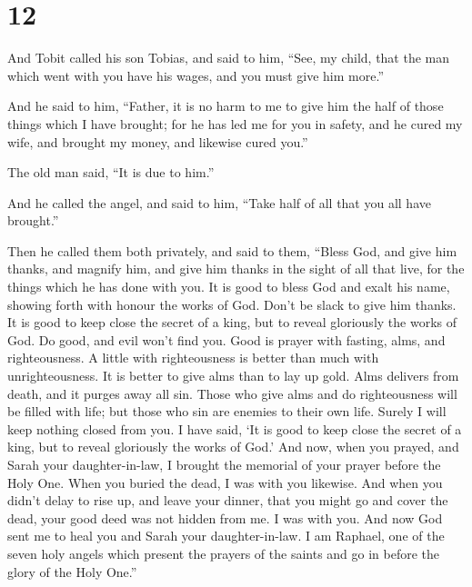\hypertarget{section-11}{%
\section{12}\label{section-11}}

 And Tobit called his son Tobias, and said to him, ``See, my
child, that the man which went with you have his wages, and you must
give him more.''

 And he said to him, ``Father, it is no harm to me to give
him the half of those things which I have brought;  for he
has led me for you in safety, and he cured my wife, and brought my
money, and likewise cured you.''

 The old man said, ``It is due to him.''

 And he called the angel, and said to him, ``Take half of
all that you all have brought.''

 Then he called them both privately, and said to them,
``Bless God, and give him thanks, and magnify him, and give him thanks
in the sight of all that live, for the things which he has done with
you. It is good to bless God and exalt his name, showing forth with
honour the works of God. Don't be slack to give him thanks. 
It is good to keep close the secret of a king, but to reveal gloriously
the works of God. Do good, and evil won't find you.  Good is
prayer with fasting, alms, and righteousness. A little with
righteousness is better than much with unrighteousness. It is better to
give alms than to lay up gold.  Alms delivers from death,
and it purges away all sin. Those who give alms and do righteousness
will be filled with life;  but those who sin are enemies to
their own life.  Surely I will keep nothing closed from
you. I have said, `It is good to keep close the secret of a king, but to
reveal gloriously the works of God.'  And now, when you
prayed, and Sarah your daughter-in-law, I brought the memorial of your
prayer before the Holy One. When you buried the dead, I was with you
likewise.  And when you didn't delay to rise up, and leave
your dinner, that you might go and cover the dead, your good deed was
not hidden from me. I was with you.  And now God sent me to
heal you and Sarah your daughter-in-law.  I am Raphael, one
of the seven holy angels which present the prayers of the saints and go
in before the glory of the Holy One.''

